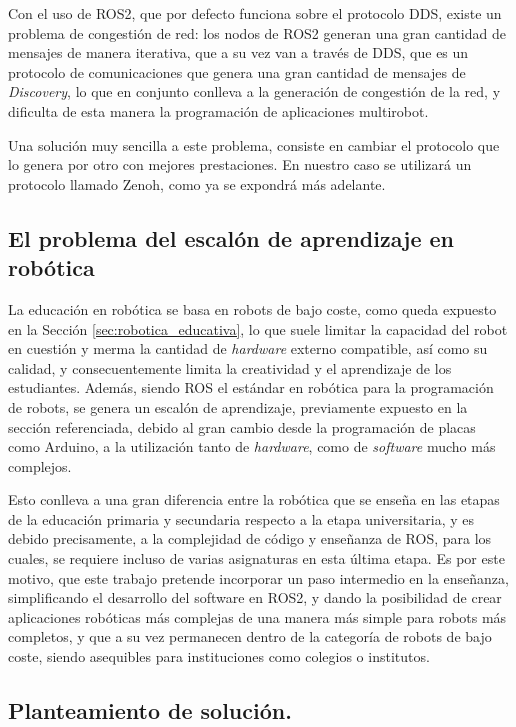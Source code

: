 Con el uso de ROS2, que por defecto funciona sobre el protocolo DDS, existe un
problema de congestión de red: los nodos de ROS2 generan una gran cantidad de
mensajes de manera iterativa, que a su vez van a través de DDS, que es un
protocolo de comunicaciones que genera una gran cantidad de mensajes de
\textit{Discovery}, lo que en conjunto conlleva a la generación de congestión de
la red, y dificulta de esta manera la programación de aplicaciones multirobot.

Una solución muy sencilla a este problema, consiste en cambiar el protocolo que
lo genera por otro con mejores prestaciones.
En nuestro caso se utilizará un protocolo llamado Zenoh, como ya se expondrá más
adelante.


\subsection{El problema del escalón de aprendizaje en robótica}
\label{sec:problema_escalon}

La educación en robótica se basa en robots de bajo coste, como queda expuesto en
la Sección \ref{sec:robotica_educativa}, lo que suele limitar la capacidad del
robot en cuestión y merma la cantidad de \textit{hardware} externo compatible,
así como su calidad, y consecuentemente limita la creatividad y el aprendizaje
de los estudiantes.
Además, siendo ROS el estándar en robótica para la programación de robots,
se genera un escalón de aprendizaje, previamente expuesto en la sección
referenciada, debido al gran cambio desde la programación de placas como
Arduino, a la utilización tanto de \textit{hardware}, como de \textit{software}
mucho más complejos.

Esto conlleva a una gran diferencia entre la robótica que se enseña en las
etapas de la educación primaria y secundaria respecto a la etapa universitaria,
y es debido precisamente, a la complejidad de código y enseñanza de ROS, para
los cuales, se requiere incluso de varias asignaturas en esta última etapa.
Es por este motivo, que este trabajo pretende incorporar un paso intermedio en
la enseñanza, simplificando el desarrollo del software en ROS2, y dando la
posibilidad de crear aplicaciones robóticas más complejas de una manera más
simple para robots más completos, y que a su vez permanecen dentro de la
categoría de robots de bajo coste, siendo asequibles para instituciones como
colegios o institutos.


\subsection{Planteamiento de solución.}
\label{sec:planteamiento_solucion}

